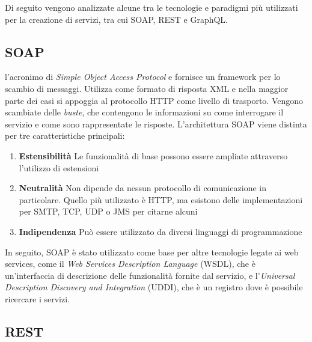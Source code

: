 Di seguito vengono analizzate alcune tra le tecnologie e paradigmi più utilizzati per la creazione di servizi, tra cui SOAP, REST e GraphQL.

\subsection{SOAP\label{sec:soap-introduzione}}

\upe l'acronimo di \emph{Simple Object Access Protocol} e fornisce un framework per lo scambio di messaggi.  Utilizza come formato di risposta XML e nella maggior parte dei casi si appoggia al protocollo HTTP come livello di trasporto. Vengono scambiate delle \emph{buste}, che contengono le informazioni su come interrogare il servizio e come sono rappresentate le risposte. L'architettura SOAP viene distinta per tre caratteristiche principali:

\begin{enumerate}
	\item \textbf{Estensibilità} Le funzionalità di base possono essere ampliate attraverso l'utilizzo di estensioni
	\item \textbf{Neutralità} Non dipende da nessun protocollo di comunicazione in particolare. Quello più utilizzato è HTTP, ma esistono delle implementazioni per SMTP, TCP, UDP o JMS per citarne alcuni
	\item \textbf{Indipendenza} Può essere utilizzato da diversi linguaggi di programmazione
\end{enumerate}

In seguito, SOAP è stato utilizzato come base per altre tecnologie legate ai web services, come il \emph{Web Services Description Language} (WSDL), che è un'interfaccia di descrizione delle funzionalità fornite dal servizio, e l'\emph{Universal Description Discovery and Integration} (UDDI), che è un registro dove è possibile ricercare i servizi.

\subsection{REST\label{sec:rest-introduzione}}

